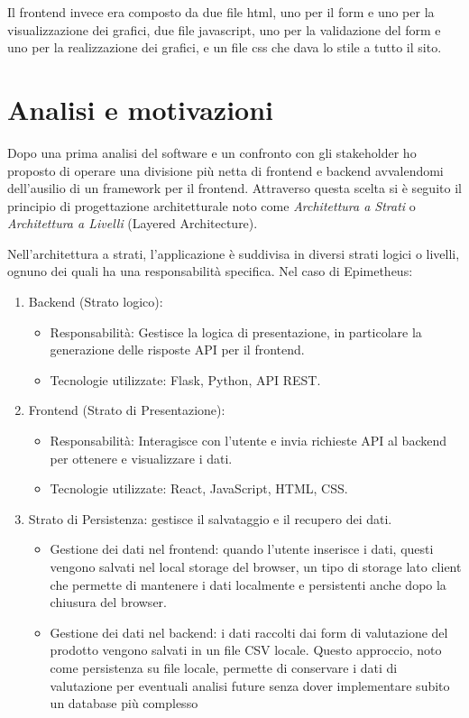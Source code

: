 Il frontend invece era composto da due file html, uno per il form e uno per la visualizzazione dei grafici, due file javascript, uno per la validazione del form e uno per la realizzazione dei grafici, e un file css che dava lo stile a tutto il sito. 

\section{Analisi e motivazioni}

Dopo una prima analisi del software e un confronto con gli stakeholder ho proposto di operare una divisione più netta di frontend e backend avvalendomi dell'ausilio di un framework per il frontend. Attraverso questa scelta si è seguito il principio di progettazione architetturale noto come \textit{Architettura a Strati} o \textit{Architettura a Livelli} (Layered Architecture).

Nell'architettura a strati, l'applicazione è suddivisa in diversi strati logici o livelli, ognuno dei quali ha una responsabilità specifica. Nel caso di Epimetheus:
\begin{enumerate}
\item Backend (Strato logico):
    \begin{itemize}
        \item  Responsabilità: Gestisce la logica di presentazione, in particolare la generazione delle risposte API per il frontend.
        \item  Tecnologie utilizzate: Flask, Python, API REST.
    \end{itemize}
\item Frontend (Strato di Presentazione):
 \begin{itemize}
    \item Responsabilità: Interagisce con l'utente e invia richieste API al backend per ottenere e visualizzare i dati.
    \item Tecnologie utilizzate: React, JavaScript, HTML, CSS.
 \end{itemize}
\item Strato di Persistenza: gestisce il salvataggio e il recupero dei dati.
    \begin{itemize}
        \item Gestione dei dati nel frontend: quando l'utente inserisce i dati, questi vengono salvati nel local storage del browser, un tipo di storage lato client che permette di mantenere i dati localmente e persistenti anche dopo la chiusura del browser.
        \item Gestione dei dati nel backend: i dati raccolti dai form di valutazione del prodotto vengono salvati in un file CSV locale. Questo approccio, noto come persistenza su file locale, permette di conservare i dati di valutazione per eventuali analisi future senza dover implementare subito un database più complesso
    \end{itemize}

\end{enumerate}

